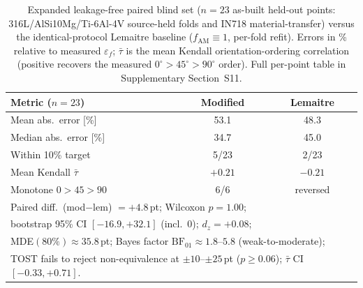\documentclass[twocolumn]{sagej}
\begin{document}
\begin{table}[htbp]
\centering
\caption{Expanded leakage-free paired blind set ($n = 23$ as-built held-out points: 316L/AlSi10Mg/Ti-6Al-4V source-held folds and IN718 material-transfer) versus the identical-protocol Lemaitre baseline ($f_{\mathrm{AM}} \equiv 1$, per-fold refit). Errors in \% relative to measured $\varepsilon_f$; $\bar\tau$ is the mean Kendall orientation-ordering correlation (positive recovers the measured $0^\circ\!>\!45^\circ\!>\!90^\circ$ order). Full per-point table in Supplementary Section~S11.}
\label{tab:blind_expanded}
\footnotesize
\begin{tabular}{l c c}
\hline
\textbf{Metric ($n=23$)} & \textbf{Modified} & \textbf{Lemaitre} \\
\hline
Mean abs.\ error [\%]   & 53.1 & 48.3 \\
Median abs.\ error [\%] & 34.7 & 45.0 \\
Within 10\% target      & 5/23 & 2/23 \\
Mean Kendall $\bar\tau$ & $+0.21$ & $-0.21$ \\
Monotone $0\!>\!45\!>\!90$ & 6/6 & reversed \\
\hline
\multicolumn{3}{l}{Paired diff.\ (mod$-$lem) $=+4.8$\,pt; Wilcoxon $p=1.00$;}\\
\multicolumn{3}{l}{bootstrap 95\% CI $[-16.9,+32.1]$ (incl.\ 0); $d_z=+0.08$;}\\
\multicolumn{3}{l}{MDE$(80\%)\approx 35.8$\,pt; Bayes factor $\mathrm{BF}_{01}\approx1.8$--$5.8$ (weak-to-moderate);}\\
\multicolumn{3}{l}{TOST fails to reject non-equivalence at $\pm10$--$\pm25$\,pt ($p\ge0.06$); $\bar\tau$ CI $[-0.33,+0.71]$.}\\
\hline
\end{tabular}
\end{table}
\end{document}
